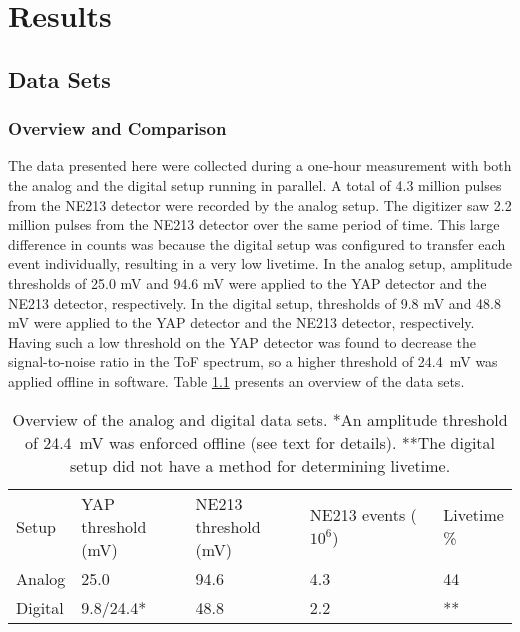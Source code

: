 \documentclass[main.tex]{subfiles}
\begin{document}
\chapter{Results}\label{ch:results}

\section{Data Sets}
\subsection{Overview and Comparison}
The data presented here were collected during a one-hour measurement with both the analog and the digital setup running in parallel. A total of 4.3 million pulses from the NE213 detector were recorded by the analog setup. The digitizer saw 2.2 million pulses from the NE213 detector over the same period of time. This large difference in counts was because the digital setup was configured to transfer each event individually, resulting in a very low livetime.
In the analog setup, amplitude thresholds of 25.0 mV and 94.6 mV were applied to the YAP detector and the NE213 detector, respectively. In the digital setup, thresholds of 9.8 mV and 48.8 mV were applied to the YAP detector and the NE213 detector, respectively. Having such a low threshold on the YAP detector was found to decrease the signal-to-noise ratio in the ToF spectrum, so a higher threshold of \SI{24.4}{\milli\volt} was applied offline in software. Table \ref{tab:settings} presents an overview of the data sets.
\begin{table}[bh]
\center
\begin{tabular}{|l|l|l|l|l|}
\hline 
Setup   & \shortstack{YAP \\threshold (mV)}  & \shortstack{NE213 \\ threshold (mV)} & \shortstack{NE213 \\ events ($\text{10}^\text{6}$)} & \shortstack{Livetime\\ \%} \\ \hhline{|=|=|=|=|=|}
Analog  & 25.0              & 94.6                & 4.3      & 44             \\ \hline
Digital & 9.8/24.4*			& 48.8                & 2.2      & **             \\ \hline
\end{tabular}
\caption[Overview of the analog and digital data sets.]{Overview of the analog and digital data sets. *An amplitude threshold of \SI{24.4}{mV} was enforced offline (see text for details). **The digital setup did not have a method for determining livetime.}
\label{tab:settings}
\end{table}
\end{document}
